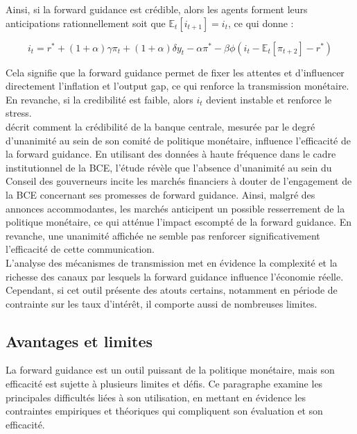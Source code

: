 Ainsi, si la forward guidance est crédible, alors les agents forment leurs anticipations rationnellement soit que $\mathbb{E}_t [i_{t+1}] = i_t$, ce qui donne : 

\begin{equation}
i_t = r^* + (1+\alpha) \gamma \pi_t + (1+\alpha) \delta y_t - \alpha \pi^* - \beta \phi (i_t - \mathbb{E}_t [\pi_{t+2}] - r^*)  
\end{equation}

Cela signifie que la forward guidance permet de fixer les attentes et d’influencer directement l’inflation et l’output gap, ce qui renforce la transmission monétaire.
En revanche, si la credibilité est faible, alors $i_t$ devient instable et renforce le stress.\\

\citep{linta2024} décrit comment la crédibilité de la banque centrale, mesurée par le degré d'unanimité au sein de son comité de politique monétaire, influence l'efficacité de la forward guidance. En utilisant des données à haute fréquence dans le cadre institutionnel de la BCE, l'étude révèle que l'absence d'unanimité au sein du Conseil des gouverneurs incite les marchés financiers à douter de l'engagement de la BCE concernant ses promesses de forward guidance. Ainsi, malgré des annonces accommodantes, les marchés anticipent un possible resserrement de la politique monétaire, ce qui atténue l'impact escompté de la forward guidance. En revanche, une unanimité affichée ne semble pas renforcer significativement l'efficacité de cette communication.\\

L’analyse des mécanismes de transmission met en évidence la complexité et la richesse des canaux par lesquels la forward guidance influence l’économie réelle. Cependant, si cet outil présente des atouts certains, notamment en période de contrainte sur les taux d’intérêt, il comporte aussi de nombreuses limites.

\subsection{Avantages et limites}

La forward guidance est un outil puissant de la politique monétaire, mais son efficacité est sujette à plusieurs limites et défis. Ce paragraphe examine les principales difficultés liées à son utilisation, en mettant en évidence les contraintes empiriques et théoriques qui compliquent son évaluation et son efficacité.

